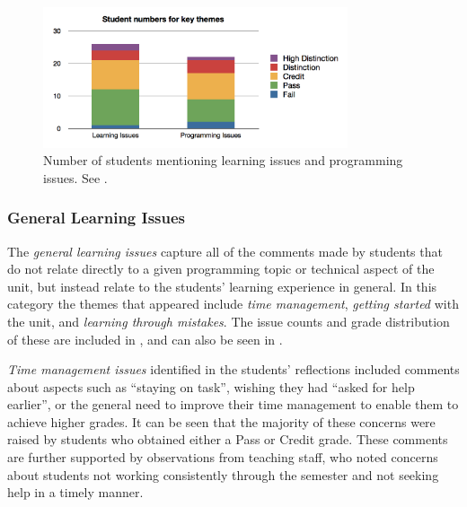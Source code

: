 \begin{figure}[thbp]
	\centering
	\includegraphics[width=0.8\textwidth]{NumStudentsMentioningIssues}
	\caption{Number of students mentioning learning issues and programming issues.  See .}
	\label{fig:student_numbers}
\end{figure}


\subsubsection{General Learning Issues} %
\label{sub:general_learning_issues}

The \emph{general learning issues} capture all of the comments made by students that do not relate directly to a given programming topic or technical aspect of the unit, but instead relate to the students' learning experience in general. In this category the themes that appeared include  \emph{time management},  \emph{getting started} with the unit, and \emph{learning through mistakes}. The issue counts and grade distribution of these are included in , and can also be seen in .

\emph{Time management issues} identified in the students' reflections included comments about aspects such as ``staying on task'', wishing they had ``asked for help earlier'', or the general need to improve their time management to enable them to achieve higher grades. It can be seen that the majority of these concerns were raised by students who obtained either a Pass or Credit grade. These comments are further supported by observations from teaching staff, who noted concerns about students not working consistently through the semester and not seeking help in a timely manner.

